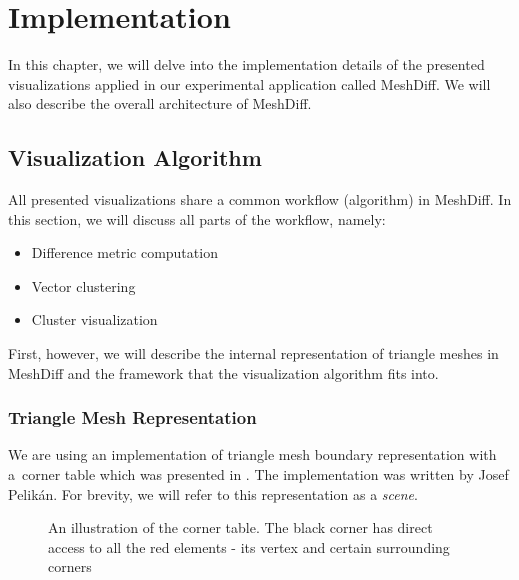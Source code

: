 \chapter{Implementation}
\label{chap:implementation}

In this chapter, we will delve into the implementation details of the presented visualizations applied in our experimental application called MeshDiff. We will also describe the overall architecture of MeshDiff.

\section{Visualization Algorithm}
\label{sec:implementation-algorithm}

All presented visualizations share a common workflow (algorithm) in MeshDiff. In this section, we will discuss all parts of the workflow, namely:

\begin{itemize}
\item Difference metric computation
\item Vector clustering
\item Cluster visualization
\end{itemize}

First, however, we will describe the internal representation of triangle meshes in MeshDiff and the framework that the visualization algorithm fits into.

\subsection{Triangle Mesh Representation}
\label{subsec:implementation-algorithm-mesh_repre}

We are using an implementation of triangle mesh boundary representation with a~corner table which was presented in \citet{Corner03}. The implementation was written by Josef Pelikán. For brevity, we will refer to this representation as a {\it scene}.

\begin{figure}[h]
\centering
\def\svgwidth{0.5\textwidth}

\caption[Corner table illustration]{An illustration of the corner table. The black corner has direct access to all the red elements - its vertex and certain surrounding corners}
\label{fig:illustration-corner_table}
\end{figure}


